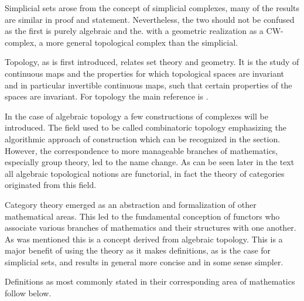 \documentclass[../../main.tex]{subfiles}
\begin{document}
    Simplicial sets arose from the concept of simplicial complexes, many of the results are similar in proof and statement. Nevertheless, the two should not be confused as the first is purely algebraic and the. with a geometric realization as a CW-complex, a more general topological complex than the simplicial. 
    
    Topology, as is first introduced, relates set theory and geometry. It is the study of continuous maps and the properties for which topological spaces are invariant and in particular invertible continuous maps, such that certain properties of the spaces are invariant. For topology the main reference is \cite{armstrong-basictop}.
    
    In the case of algebraic topology a few constructions of complexes will be introduced. The field used to be called combinatoric topology emphasizing the algorithmic approach of construction which can be recognized in the section. However, the correspondence to more manageable branches of mathematics, especially group theory, led to the name change. As can be seen later in the text all algebraic topological notions are functorial, in fact the theory of categories originated from this field. 
    
    Category theory emerged as an abstraction and formalization of other mathematical areas. This led to the fundamental conception of functors who associate various branches of mathematics and their structures with one another. As was mentioned this is a concept derived from algebraic topology. This is a major benefit of using the theory as it makes definitions, as is the case for simplicial sets, and results in general more concise and in some sense simpler. 
    
    Definitions as most commonly stated in their corresponding area of mathematics follow below. 
    
\end{document}
